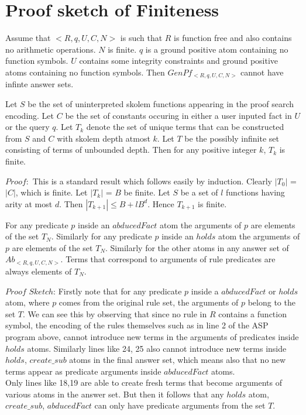 \documentclass{article}
\begin{document}
\section{Proof sketch of Finiteness}\label{sec:proof_finiteness}
\begin{theorem}[Finiteness]\label{Finiteness}
Assume that $<R,q,U,C,N>$ is such that $R$ is function free and also contains no arithmetic operations. $N$ is finite. $q$ is a ground positive atom containing no function symbols. $U$ contains some integrity constraints and ground positive atoms containing no function symbols. Then $GenPf_{<R,q,U,C,N>}$ cannot have infinte answer sets. 
\end{theorem}
\begin{lemma}
Let $S$ be the set of uninterpreted skolem functions appearing in the proof search encoding. Let $C$ be the set of constants occuring in either a user inputed fact in $U$ or the query $q$. Let $T_{k}$ denote the set of unique terms that can be constructed from $S$ and $C$ with skolem depth atmost $k$. Let $T$ be the possibly infinite set consisting of terms of unbounded depth. Then for any positive integer $k$, $T_{k}$ is finite.
\end{lemma}

$Proof:$ This is a standard result which follows easily by induction. Clearly $|T_{0}|$ = $|C|$, which is finite. Let $|T_{k}|$ = $B$ be finite. Let $S$ be a set of $l$ functions having arity at most $d$. Then $|T_{k+1}|\leq B + lB^{d}$. Hence $T_{k+1}$ is finite.  
\begin{lemma}
 For any predicate $p$ inside an $abducedFact$ atom the arguments of $p$ are elements of the set $T_{N}$. Similarly for any predicate $p$ inside an $holds$ atom the arguments of $p$ are elements of the set $T_{N}$. Similarly for the other atoms in any answer set of $Ab_{<R,q,U,C,N>}$. Terms that correspond to arguments of rule predicates are always elements of $T_{N}$.\\ 
\end{lemma}
$Proof$ $Sketch$: Firstly note that for any predicate $p$ inside a $abducedFact$ or $holds$ atom, where $p$ comes from the original rule set, the arguments of $p$ belong to the set $T$. We can see this by observing that since no rule in $R$ contains a function symbol, the encoding of the rules themselves such as in line 2 of the ASP program above, cannot introduce new terms in the arguments of predicates inside $holds$ atoms. Similarly lines like 24, 25 also cannot introduce new terms inside $holds$, $create\_sub$ atoms in the final answer set, which means also that no new terms appear as predicate arguments inside $abducedFact$ atoms. \\ Only lines like 18,19 are able to create fresh terms that become arguments of various atoms in the answer set. But then it follows that any $holds$ atom, $create\_sub$, $abducedFact$ can only have predicate arguments from the set $T$.    
\end{document}
